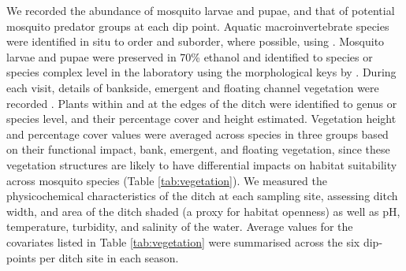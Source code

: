 \documentclass[lineno,sn-basic]{sn-jnl}%
\begin{document}
We recorded the abundance of mosquito larvae and pupae, and that of potential mosquito predator groups at each dip point. Aquatic macroinvertebrate species were identified in situ to order and suborder, where possible, using \citep{dobsonGuideFreshwaterInvertebrates2012}. Mosquito larvae and pupae were preserved in 70\% ethanol and identified to species or species complex level in the laboratory using the morphological keys by \citep{beckerMosquitoesTheirControl2010b, schaffnerMosquitoesEuropeIdentification2001, cranstonKeysAdultsMale1987a, snowMosquitoes1990a}. During each visit, details of bankside, emergent and floating channel vegetation were recorded \citep{copeGrassesBritishIsles2009a, jermySedgesBritishIsles1995}. Plants within and at the edges of the ditch were identified to genus or species level, and their percentage cover and height estimated. Vegetation height and percentage cover values were averaged across species in three groups based on their functional impact, bank, emergent, and floating vegetation, since these vegetation structures are likely to have differential impacts on habitat suitability across mosquito species (Table \ref{tab:vegetation}). We measured the physicochemical characteristics of the ditch at each sampling site, assessing ditch width, and area of the ditch shaded (a proxy for habitat openness) as well as pH, temperature, turbidity, and salinity of the water. Average values for the covariates listed in Table \ref{tab:vegetation} were summarised across the six dip-points per ditch site in each season.
\end{document}
